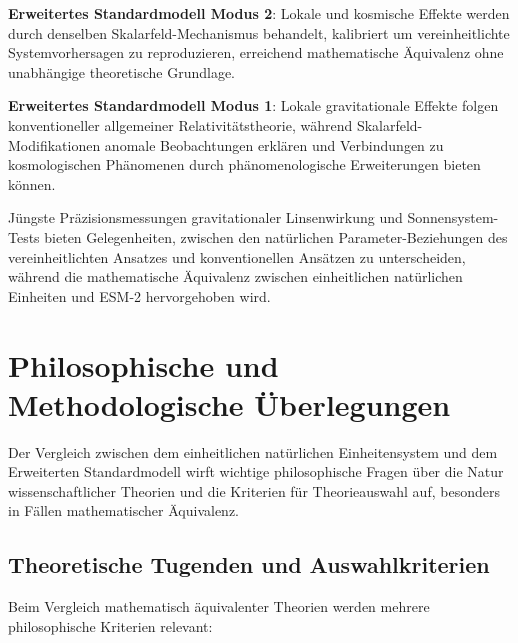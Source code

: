 \documentclass[12pt,a4paper]{article}
\begin{document}
	\textbf{Erweitertes Standardmodell Modus 2}: Lokale und kosmische Effekte werden durch denselben Skalarfeld-Mechanismus behandelt, kalibriert um vereinheitlichte Systemvorhersagen zu reproduzieren, erreichend mathematische Äquivalenz ohne unabhängige theoretische Grundlage.
	
	\textbf{Erweitertes Standardmodell Modus 1}: Lokale gravitationale Effekte folgen konventioneller allgemeiner Relativitätstheorie, während Skalarfeld-Modifikationen anomale Beobachtungen erklären und Verbindungen zu kosmologischen Phänomenen durch phänomenologische Erweiterungen bieten können.
	
	Jüngste Präzisionsmessungen gravitationaler Linsenwirkung und Sonnensystem-Tests bieten Gelegenheiten, zwischen den natürlichen Parameter-Beziehungen des vereinheitlichten Ansatzes und konventionellen Ansätzen zu unterscheiden, während die mathematische Äquivalenz zwischen einheitlichen natürlichen Einheiten und ESM-2 hervorgehoben wird.
	
	\section{Philosophische und Methodologische Überlegungen}
	\label{sec:philosophical_considerations}
	
	Der Vergleich zwischen dem einheitlichen natürlichen Einheitensystem und dem Erweiterten Standardmodell wirft wichtige philosophische Fragen über die Natur wissenschaftlicher Theorien und die Kriterien für Theorieauswahl auf, besonders in Fällen mathematischer Äquivalenz.
	
	\subsection{Theoretische Tugenden und Auswahlkriterien}
	\label{subsec:theoretical_virtues}
	
	Beim Vergleich mathematisch äquivalenter Theorien werden mehrere philosophische Kriterien relevant:
	
\end{document}
